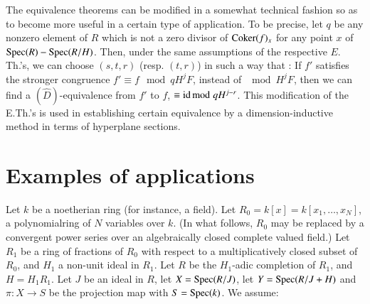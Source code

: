 \begin{subremark}\label{art10-sec2-rem2.4.3}
The equivalence theorems can be modified in a somewhat technical fashion so as to become more useful in a certain type of application. To be precise, let $q$ be any nonzero element of $R$ which is not a zero divisor of $\operatorname{\mathrm{Coker}}(f)_{x}$ for any point $x$ of $\operatorname{\mathrm{Spec}} (R)-\operatorname{\mathrm{Spec}}(R/H)$. Then, under the same assumptions of the respective $E$. Th.'s, we can choose $(s,t,r)$ (resp. $(t,r)$) in such a way that : If $f'$ satisfies the stronger congruence $f'\equiv f\mod qH^{j}F$, instead of $\mod H^{j}F$, then we can find a $(\widehat{D})$-equivalence from $f'$ to $f$, $\equiv \operatorname{\mathrm{id}}{\rm{mod}}\kern.3em qH^{j-r}$. This modification of the E.Th.'s is used in establishing certain equivalence by a dimension-inductive method in terms of hyperplane sections.
\end{subremark}

\section{Examples of applications}\label{art10-sec3}

\begin{romanexam}\label{art10-sec3-exam-I}
Let $k$ be a noetherian ring (for instance, a field). Let $R_{0}=k[x]=k[x_{1},\ldots,x_{N}]$, a polynomial\pageoriginale ring of $N$ variables over $k$. (In what follows, $R_{0}$ may be replaced by a convergent power series over an algebraically closed complete valued field.) Let $R_{1}$ be a ring of fractions of $R_{0}$ with respect to a multiplicatively closed subset of $R_{0}$, and $H_{1}$ a non-unit ideal in $R_{1}$. Let $R$ be the $H_{1}$-adic completion of $R_{1}$, and $H=H_{1}R_{1}$. Let $J$ be an ideal in $R$, let $X=\operatorname{\mathrm{Spec}} (R/J)$, let $Y=\operatorname{\mathrm{Spec}} (R/J+H)$ and $\pi:X\to S$ be the projection map with $S=\operatorname{\mathrm{Spec}} (k)$. We assume:
\end{romanexam}

